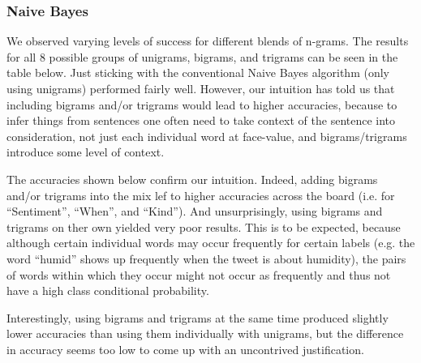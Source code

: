 \subsubsection{Naive Bayes}
	We observed varying levels of success for different blends of n-grams. The results for all 8 possible groups of unigrams, bigrams, and trigrams can be seen in the table below. Just sticking with the conventional Naive Bayes algorithm (only using unigrams) performed fairly well. However, our intuition has told us that including bigrams and/or trigrams would lead to higher accuracies, because to infer things from sentences one often need to take context of the sentence into consideration, not just each individual word at face-value, and bigrams/trigrams introduce some level of context.

	The accuracies shown below confirm our intuition. Indeed, adding bigrams and/or trigrams into the mix lef to higher accuracies across the board (i.e. for ``Sentiment'', ``When'', and ``Kind''). And unsurprisingly, using bigrams and trigrams on ther own yielded very poor results. This is to be expected, because although certain individual words may occur frequently for certain labels (e.g. the word ``humid'' shows up frequently when the tweet is about humidity), the pairs of words within which they occur might not occur as frequently and thus not have a high class conditional probability. 

	Interestingly, using bigrams and trigrams at the same time produced slightly lower accuracies than using them individually with unigrams, but the difference in accuracy seems too low to come up with an uncontrived justification.
	
\begin{figure}[H]
\noindent{}
\end{figure}
